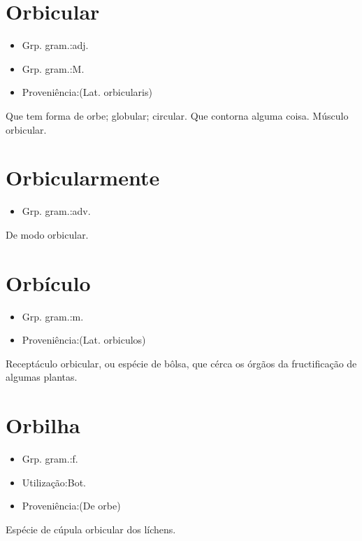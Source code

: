 \section{Orbicular}
\begin{itemize}
\item {Grp. gram.:adj.}
\end{itemize}
\begin{itemize}
\item {Grp. gram.:M.}
\end{itemize}
\begin{itemize}
\item {Proveniência:(Lat. \textunderscore orbicularis\textunderscore )}
\end{itemize}
Que tem forma de orbe; globular; circular.
Que contorna alguma coisa.
Músculo orbicular.
\section{Orbicularmente}
\begin{itemize}
\item {Grp. gram.:adv.}
\end{itemize}
De modo orbicular.
\section{Orbículo}
\begin{itemize}
\item {Grp. gram.:m.}
\end{itemize}
\begin{itemize}
\item {Proveniência:(Lat. \textunderscore orbiculos\textunderscore )}
\end{itemize}
Receptáculo orbicular, ou espécie de bôlsa, que cérca os órgãos da fructificação de algumas plantas.
\section{Orbilha}
\begin{itemize}
\item {Grp. gram.:f.}
\end{itemize}
\begin{itemize}
\item {Utilização:Bot.}
\end{itemize}
\begin{itemize}
\item {Proveniência:(De \textunderscore orbe\textunderscore )}
\end{itemize}
Espécie de cúpula orbicular dos líchens.
